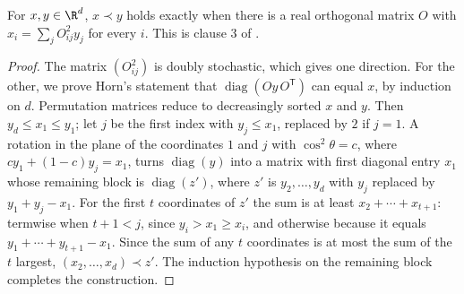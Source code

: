 \begin{theorem}
    \label{thm:vector_majorization_orthostochastic}
    \leanok
    For $x,y\in\R^d$, $x\prec y$ holds exactly when there is a real
    orthogonal matrix $O$ with $x_i=\sum_jO_{ij}^2y_j$ for every $i$. This is
    clause 3 of \cite[Theorem~8.4]{Wolf2012Quantum}.
\end{theorem}
\begin{proof}\leanok
    The matrix $(O_{ij}^2)$ is doubly stochastic, which gives one direction.
    For the other, we prove Horn's statement that $\operatorname{diag}(Oy\,O^{\mathsf T})$
    can equal $x$, by induction on $d$. Permutation matrices reduce to
    decreasingly sorted $x$ and $y$. Then $y_d\le x_1\le y_1$; let $j$ be the
    first index with $y_j\le x_1$, replaced by $2$ if $j=1$. A rotation in
    the plane of the coordinates $1$ and $j$ with $\cos^2\theta=c$, where
    $cy_1+(1-c)y_j=x_1$, turns $\operatorname{diag}(y)$ into a matrix with
    first diagonal entry $x_1$ whose remaining block is $\operatorname{diag}(z')$,
    where $z'$ is $y_2,\ldots,y_d$ with $y_j$ replaced by $y_1+y_j-x_1$.
    For the first $t$ coordinates of $z'$ the sum is at least
    $x_2+\cdots+x_{t+1}$: termwise when $t+1<j$, since $y_i>x_1\ge x_i$, and
    otherwise because it equals $y_1+\cdots+y_{t+1}-x_1$. Since the sum of any
    $t$ coordinates is at most the sum of the $t$ largest, $(x_2,\ldots,x_d)\prec z'$.
    The induction hypothesis on the remaining block completes the construction.
\end{proof}

